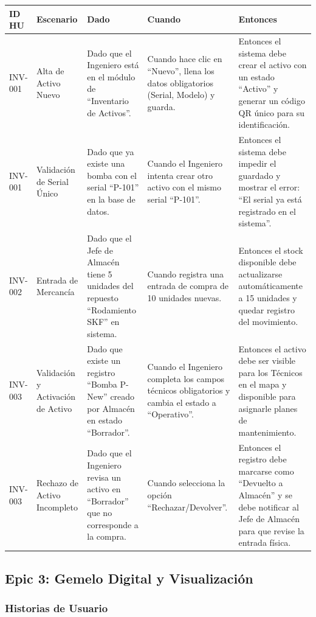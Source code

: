 \documentclass[12pt, a4paper]{article}
\begin{document}
\begin{longtable}{|p{1.8cm}|p{3cm}|p{3.5cm}|p{3.5cm}|p{3.5cm}|}
\hline
\textbf{ID HU} & \textbf{Escenario} & \textbf{Dado} & \textbf{Cuando} & \textbf{Entonces} \\ \hline
INV-001 & Alta de Activo Nuevo & Dado que el Ingeniero está en el módulo de ``Inventario de Activos''. & Cuando hace clic en ``Nuevo'', llena los datos obligatorios (Serial, Modelo) y guarda. & Entonces el sistema debe crear el activo con un estado ``Activo'' y generar un código QR único para su identificación. \\ \hline
INV-001 & Validación de Serial Único & Dado que ya existe una bomba con el serial ``P-101'' en la base de datos. & Cuando el Ingeniero intenta crear otro activo con el mismo serial ``P-101''. & Entonces el sistema debe impedir el guardado y mostrar el error: ``El serial ya está registrado en el sistema''. \\ \hline
INV-002 & Entrada de Mercancía & Dado que el Jefe de Almacén tiene 5 unidades del repuesto ``Rodamiento SKF'' en sistema. & Cuando registra una entrada de compra de 10 unidades nuevas. & Entonces el stock disponible debe actualizarse automáticamente a 15 unidades y quedar registro del movimiento. \\ \hline
INV-003 & Validación y Activación de Activo & Dado que existe un registro ``Bomba P-New'' creado por Almacén en estado ``Borrador''. & Cuando el Ingeniero completa los campos técnicos obligatorios y cambia el estado a ``Operativo''. & Entonces el activo debe ser visible para los Técnicos en el mapa y disponible para asignarle planes de mantenimiento. \\ \hline
INV-003 & Rechazo de Activo Incompleto & Dado que el Ingeniero revisa un activo en ``Borrador'' que no corresponde a la compra. & Cuando selecciona la opción ``Rechazar/Devolver''. & Entonces el registro debe marcarse como ``Devuelto a Almacén'' y se debe notificar al Jefe de Almacén para que revise la entrada física. \\ \hline
\end{longtable}

\subsection{Epic 3: Gemelo Digital y Visualización}

\subsubsection*{Historias de Usuario}
\end{document}

